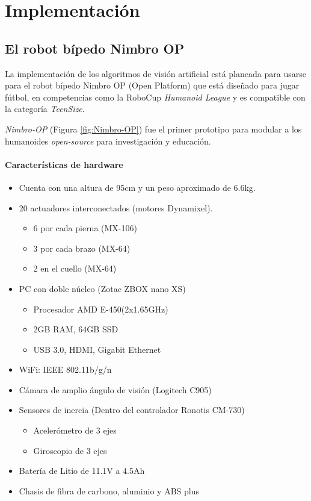 \chapter{Implementación}

	\section{El robot bípedo Nimbro OP}
	La implementación de los algoritmos de visión artificial está planeada para usarse para el robot bípedo Nimbro OP (Open Platform) que está diseñado para jugar fútbol, en competencias como la RoboCup \textit{Humanoid League} y es compatible con la categoría \textit{TeenSize}.

	\textit{Nimbro-OP} (Figura \ref{fig:Nimbro-OP}) fue el primer prototipo para modular a los humanoides \textit{open-source} para investigación y educación. 
	\subsubsection*{Características de hardware}
	\begin{itemize}
	\item Cuenta con una altura de 95cm y un peso aproximado de 6.6kg.
	\item 20 actuadores interconectados (motores Dynamixel).
		\begin{itemize}
			\item 6 por cada pierna (MX-106)
			\item 3 por cada brazo (MX-64)
			\item 2 en el cuello (MX-64)
		\end{itemize}
	\item PC con doble núcleo (Zotac ZBOX nano XS)
		\begin{itemize}
		\item Procesador AMD E-450(2x1.65GHz) 
		\item 2GB RAM, 64GB SSD
		\item USB 3.0, HDMI, Gigabit Ethernet
		\end{itemize}
	\item WiFi: IEEE 802.11b/g/n
	\item Cámara de amplio ángulo de visión (Logitech C905)
	\item Sensores de inercia (Dentro del controlador Ronotis CM-730)
		\begin{itemize}
		\item Acelerómetro de 3 ejes
		\item Giroscopio de 3 ejes
		\end{itemize}
	\item Batería de Litio de 11.1V a 4.5Ah
	\item Chasis de fibra de carbono, aluminio y ABS plus
	\end{itemize}
	
